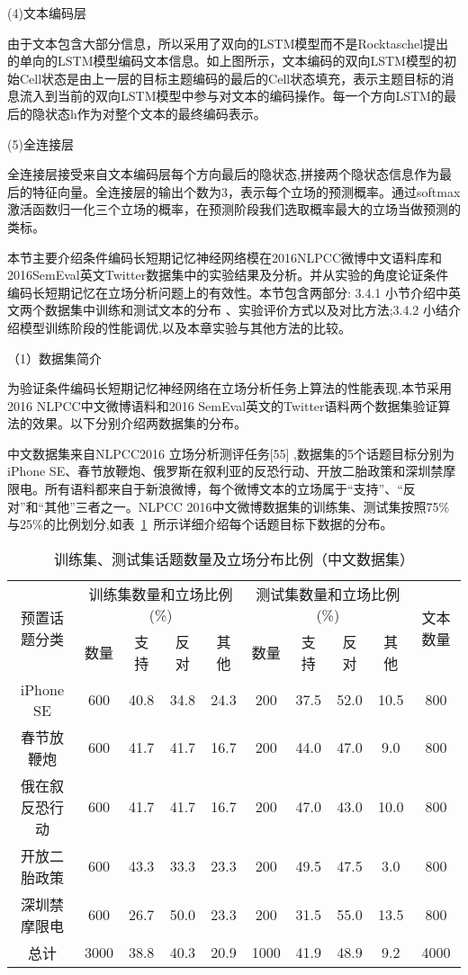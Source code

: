 (4)文本编码层

由于文本包含大部分信息，所以采用了双向的LSTM模型而不是Rocktaschel提出的单向的LSTM模型编码文本信息。如上图所示，文本编码的双向LSTM模型的初始Cell状态是由上一层的目标主题编码的最后的Cell状态填充，表示主题目标的消息流入到当前的双向LSTM模型中参与对文本的编码操作。每一个方向LSTM的最后的隐状态h作为对整个文本的最终编码表示。

(5)全连接层


全连接层接受来自文本编码层每个方向最后的隐状态,拼接两个隐状态信息作为最后的特征向量。全连接层的输出个数为3，表示每个立场的预测概率。通过softmax激活函数归一化三个立场的概率，在预测阶段我们选取概率最大的立场当做预测的类标。


本节主要介绍条件编码长短期记忆神经网络模在2016NLPCC微博中文语料库和2016SemEval英文Twitter数据集中的实验结果及分析。并从实验的角度论证条件编码长短期记忆在立场分析问题上的有效性。本节包含两部分: 3.4.1 小节介绍中英文两个数据集中训练和测试文本的分布 、实验评价方式以及对比方法;3.4.2 小结介绍模型训练阶段的性能调优,以及本章实验与其他方法的比较。


（1）数据集简介

为验证条件编码长短期记忆神经网络在立场分析任务上算法的性能表现,本节采用2016 NLPCC中文微博语料和2016 SemEval英文的Twitter语料两个数据集验证算法的效果。以下分别介绍两数据集的分布。

中文数据集来自NLPCC2016 立场分析测评任务[55] ,数据集的5个话题目标分别为 iPhone SE、春节放鞭炮、俄罗斯在叙利亚的反恐行动、开放二胎政策和深圳禁摩限电。所有语料都来自于新浪微博，每个微博文本的立场属于“支持”、“反对”和“其他”三者之一。NLPCC 2016中文微博数据集的训练集、测试集按照75\%与25\%的比例划分,如表~\ref{chinesedata}~所示详细介绍每个话题目标下数据的分布。
\begin{table}[htbp]
	\caption[table123]{训练集、测试集话题数量及立场分布比例（中文数据集）}
	\label{chinesedata}
	\vspace{0.5em}\centering\wuhao
	\begin{tabular}{cccccccccc}
		\toprule[1.5pt]
		\multirow{2}{*}{预置话题分类}& \multicolumn{4}{c}{训练集数量和立场比例(\%)} 
		& \multicolumn{4}{c}{测试集数量和立场比例(\%)}  &\multirow{2}{*}{文本数量}\\
		\cline{2-9}
		\quad&数量& 支持&反对&其他&数量& 支持&反对&其他 \\
		\midrule[1pt]
		iPhone SE&600&40.8&34.8&24.3&200&37.5&52.0&10.5&800\\
		春节放鞭炮&600&41.7&41.7&16.7&200&44.0&47.0&9.0&800\\
		俄在叙反恐行动&600&41.7&41.7&16.7&200&47.0&43.0&10.0&800\\
		开放二胎政策&600&43.3&33.3&23.3&200&49.5&47.5&3.0&800\\
		深圳禁摩限电&600&26.7&50.0&23.3&200&31.5&55.0&13.5&800\\
		总计&3000&38.8&40.3&20.9&1000&41.9&48.9&9.2&4000\\
		\bottomrule[1.5pt]
	\end{tabular}
\end{table}

